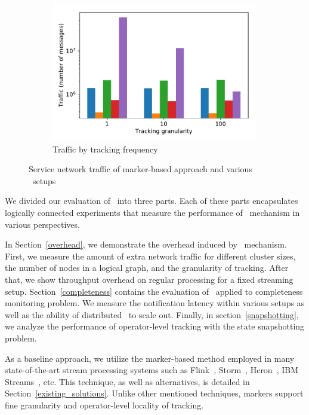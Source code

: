 \begin{figure}[t!]
\begin{subfigure}[b]{0.32\textwidth}
            \includegraphics[width=0.99\textwidth]{pics/traffic_by_tracking_frequency_bars.pdf}
            \caption{Traffic by tracking frequency}
            \label{traffic_granularity}
	\end{subfigure}
    \caption{Service network traffic of marker-based approach and various \tracker\ setups}
    \label{traffic_plots}
\end{figure}

\label {fs-acker-experiments}

We divided our evaluation of \tracker\ into three parts. Each of these parts encapsulates logically connected experiments that measure the performance of \tracker\ mechanism in various perspectives.

In Section~\ref{overhead}, we demonstrate the overhead induced by \tracker\ mechanism. First, we measure the amount of extra network traffic for different cluster sizes, the number of nodes in a logical graph, and the granularity of tracking. After that, we show throughput overhead on regular processing for a fixed streaming setup. Section~\ref{completeness} contains the evaluation of \tracker\ applied to completeness monitoring problem. We measure the notification latency within various setups as well as the ability of distributed \tracker\ to scale out. Finally, in section~\ref{snapshotting}, we analyze the performance of operator-level tracking with the state snapshotting problem. 

As a baseline approach, we utilize the marker-based method employed in many state-of-the-art stream processing systems such as Flink~\cite{Carbone:2017:SMA:3137765.3137777}, Storm~\cite{apache:storm:state}, Heron~\cite{Kulkarni:2015:THS:2723372.2742788}, IBM Streams~\cite{jacques2016consistent}, etc. This technique, as well as alternatives, is detailed in Section~\ref{existing_solutions}. Unlike other mentioned techniques, markers support fine granularity and operator-level locality of tracking. 

